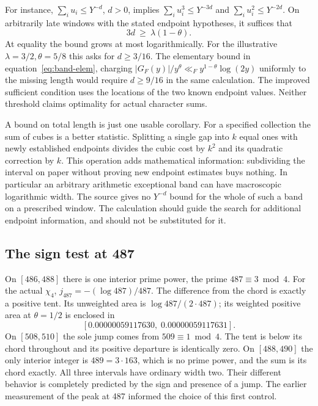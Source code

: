 \documentclass[12pt,letterpaper]{article}
\begin{document}
For instance, \(\sum_i u_i\le Y^{-d}\), \(d>0\), implies \(\sum_i u_i^3\le Y^{-3d}\) and \(\sum_i u_i^2\le Y^{-2d}\). On arbitrarily late windows with the stated endpoint hypotheses, it suffices that
\[
                    3d\ \ge\ \lambda(1-\theta).
\]
At equality the bound grows at most logarithmically. For the illustrative \(\lambda=3/2,\theta=5/8\) this asks for \(d\ge3/16\). The elementary bound in equation~\eqref{eq:band-elem}, charging \( |G_F(y)|/y^\theta\ll_F y^{1-\theta}\log(2y)\) uniformly to the missing length would require \(d\ge9/16\) in the same calculation. The improved sufficient condition uses the locations of the two known endpoint values. Neither threshold claims optimality for actual character sums.

A bound on total length is just one usable corollary. For a specified collection the sum of cubes is a better statistic. Splitting a single gap into \(k\) equal ones with newly established endpoints divides the cubic cost by \(k^2\) and its quadratic correction by \(k\). This operation adds mathematical information: subdividing the interval on paper without proving new endpoint estimates buys nothing. In particular an arbitrary arithmetic exceptional band can have macroscopic logarithmic width. The source gives no \(Y^{-d}\) bound for the whole of such a band on a prescribed window. The calculation should guide the search for additional endpoint information, and should not be substituted for it.

\subsection{The sign test at 487}
On \([486,488]\) there is one interior prime power, the prime \(487\equiv3\bmod4\). For the actual \(\chi_4\), \(j_{487}=-(\log487)/487\). The difference from the chord is exactly a positive tent. Its unweighted area is \(\log487/(2\cdot487)\); its weighted positive area at \(\theta=1/2\) is enclosed in
\[
        [0.00000059117630,\;0.00000059117631].
\]
On \([508,510]\) the sole jump comes from \(509\equiv1\bmod4\). The tent is below its chord throughout and its positive departure is identically zero. On \([488,490]\) the only interior integer is \(489=3\cdot163\), which is no prime power, and the sum is its chord exactly. All three intervals have ordinary width two. Their different behavior is completely predicted by the sign and presence of a jump. The earlier measurement of the peak at 487 informed the choice of this first control.
\end{document}
